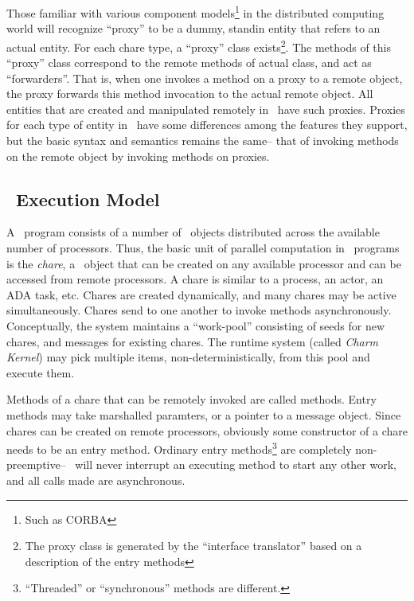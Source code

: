 Those familiar with various component models\footnote{Such as CORBA} in the
distributed computing world will recognize ``proxy'' to be a dummy, standin
entity that refers to an actual entity.  For each chare type, a ``proxy''
class exists\footnote{The proxy class is generated by the ``interface
translator'' based on a description of the entry methods}.  The methods of
this ``proxy'' class correspond to the remote methods of actual class, and
act as ``forwarders''. That is, when one invokes a method on a proxy to a
remote object, the proxy forwards this method invocation to the actual
remote object. All entities that are created and manipulated remotely in
\charmpp\ have such proxies. Proxies for each type of entity in \charmpp\
have some differences among the features they support, but the basic syntax
and semantics remains the same-- that of invoking methods on the remote
object by invoking methods on proxies.


\subsection{\charmpp\ Execution Model}

A \charmpp\ program consists of a number of \charmpp\ objects distributed
across the available number of processors. Thus, the basic unit of parallel
computation in \charmpp\ programs is the {\em chare}, a \charmpp\
object that can be created on any available processor and can be accessed from
remote processors.  A \index{chare}chare is similar to a process, an actor, an
ADA task, etc.  \index{chare}Chares are created dynamically, and many chares
may be active simultaneously.  Chares send {\em messages} to one
another to invoke methods asynchronously.  Conceptually, the system maintains a
``work-pool'' consisting of seeds for new \index{chare}chares, and
\index{message}messages for existing chares. The runtime system (called {\em
Charm Kernel}) may pick multiple items, non-deterministically, from this pool
and execute them.  

Methods of a chare that can be remotely invoked are called
 methods.  Entry methods may take marshalled
paramters, or a pointer to a message object.  Since \index{chare}chares can
be created on remote processors, obviously some constructor of a chare needs
to be an entry method.  Ordinary entry methods\footnote{``Threaded'' or
``synchronous'' methods are different.} are completely non-preemptive--
\charmpp\ will never interrupt an executing method to start any other work,
and all calls made are asynchronous.

